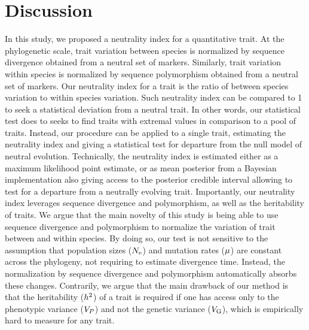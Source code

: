 \documentclass{article}
\begin{document}
\section{Discussion}\label{sec:discussion}

In this study, we proposed a neutrality index for a quantitative trait.
At the phylogenetic scale, trait variation between species is normalized by sequence divergence obtained from a neutral set of markers.
Similarly, trait variation within species is normalized by sequence polymorphism obtained from a neutral set of markers.
Our neutrality index for a trait is the ratio of between species variation to within species variation.
Such neutrality index can be compared to 1 to seek a statistical deviation from a neutral trait.
In other words, our statistical test does to seeks to find traits with extremal values in comparison to a pool of traits.
Instead, our procedure can be applied to a single trait, estimating the neutrality index and giving a statistical test for departure from the null model of neutral evolution.
Technically, the neutrality index is estimated either as a maximum likelihood point estimate, or as mean posterior from a Bayesian implementation also giving access to the posterior credible interval allowing to test for a departure from a neutrally evolving trait.
Importantly, our neutrality index leverages sequence divergence and polymorphism, as well as the heritability of traits.
We argue that the main novelty of this study is being able to use sequence divergence and polymorphism to normalize the variation of trait between and within species.
By doing so, our test is not sensitive to the assumption that population sizes ($N_{\text{e}}$) and mutation rates ($\mu$) are constant across the phylogeny, not requiring to estimate divergence time\cite{litsios_effects_2012}.
Instead, the normalization by sequence divergence and polymorphism automatically absorbs these changes\cite{seo_estimating_2004}.
Contrarily, we argue that the main drawback of our method is that the heritability ($h^2$) of a trait is required if one has access only to the phenotypic variance ($V_{P}$) and not the genetic variance ($V_{\mathrm{G}}$), which is empirically hard to measure for any trait.
\end{document}
